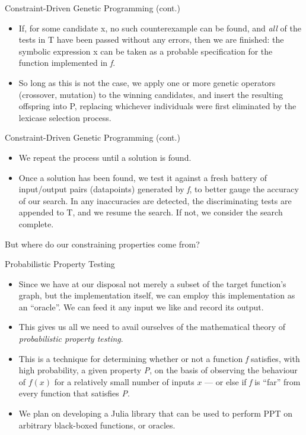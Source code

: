 \documentclass[presentation]{beamer}
\begin{document}
\begin{frame}[label={sec:orgfbc3227}]{Constraint-Driven Genetic Programming (cont.)}
\begin{itemize}
\item If, for some candidate \alert{x}, no such counterexample can be found, and \emph{all} of the tests in \alert{T} have been passed without any errors, then we are finished: the symbolic expression \alert{x} can be taken as a probable specification for the function implemented in \emph{f}.
\item So long as this is not the case, we apply one or more genetic operators (crossover, mutation) to the winning candidates, and insert the resulting offspring into \alert{P}, replacing whichever individuals were first eliminated by the lexicase selection process.
\end{itemize}
\end{frame}

\begin{frame}[label={sec:org6217455}]{Constraint-Driven Genetic Programming (cont.)}
\begin{itemize}
\item We repeat the process until a solution is found.
\item Once a solution has been found, we test it against a fresh battery of input/output pairs (datapoints) generated by \emph{f}, to better gauge the accuracy of our search. In any inaccuracies are detected, the discriminating tests are appended to \alert{T}, and we resume the search. If not, we consider the search complete.
\end{itemize}

\begin{block}{But where do our constraining properties come from?}
\end{block}
\end{frame}

\begin{frame}[label={sec:orgbdfd6cb}]{Probabilistic Property Testing}
\begin{itemize}
\item Since we have at our disposal not merely a subset of the target function's graph, but the implementation itself, we can employ this implementation as an ``oracle''. We can feed it any input we like and record its output.

\item This gives us all we need to avail ourselves of the mathematical theory of \emph{probabilistic property testing}.

\item This is a technique for determining whether or not a function \emph{f} satisfies, with high probability, a given property \emph{P}, on the basis of observing the behaviour of \(f(x)\) for a relatively small number of inputs \(x\) --- or else if \emph{f} is ``far'' from every function that satisfies \emph{P}.

\item We plan on developing a Julia library that can be used to perform PPT on arbitrary black-boxed functions, or oracles.
\end{itemize}
\end{frame}
\end{document}
